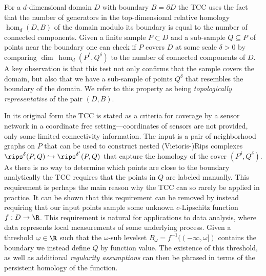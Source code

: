 
For a $d$-dimensional domain $D$ with boundary $B = \partial D$ the TCC uses the fact that the number of generators in the top-dimensional relative homology $\hom_d(D, B)$ of the domain modulo its boundary is equal to the number of connected components.
Given a finite sample $P\subset D$ and a sub-sample $Q\subseteq P$ of points near the boundary one can check if $P$ covers $D$ at some scale $\delta > 0$ by comparing $\dim~\hom_d(P^\delta, Q^\delta)$ to the number of connected components of $D$.
A key observation is that this test not only confirms that the sample covers the domain, but also that we have a sub-sample of points $Q^\delta$ that resembles the boundary of the domain.
We refer to this property as being \emph{topologically representative} of the pair $(D,B)$.

In its original form the TCC is stated as a criteria for coverage by a sensor network in a coordinate free setting---coordinates of sensors are not provided, only some limited connectivity information.
The input is a pair of neighborhood graphs on $P$ that can be used to construct nested (Vietoris-)Rips complexes $\rips^\delta(P,Q)\hookrightarrow\rips^{\delta'}(P,Q)$ that capture the homology of the cover $(P^\delta, Q^\delta)$.
As there is no way to determine which points are close to the boundary analytically the TCC requires that the points in $Q$ are labeled manually.
This requirement is perhaps the main reason why the TCC can so rarely be applied in practice.
It can be shown that this requirement can be removed by instead requiring that our input points sample some unknown $c$-Lipschitz function $f : D\to \R$.
This requirement is natural for applications to data analysis, where data represents local measurements of some underlying process.
Given a threshold $\omega\in\R$ such that the $\omega$-sub levelset $B_\omega = f^{-1}((-\infty,\omega])$ contains the boundary we instead define $Q$ by function value.
The existence of this threshold, as well as additional \emph{regularity assumptions} can then be phrased in terms of the persistent homology of the function.

